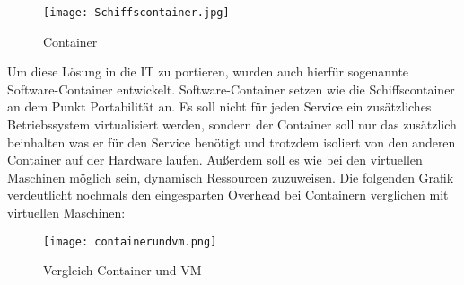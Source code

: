 \begin{figure}[H]
	\begin{center}
		\texttt{[image: Schiffscontainer.jpg]}
	\end{center}
	\caption[Container]{Container \footnotemark}
	\label{fig:HW1}
\end{figure}
Um diese Lösung in die IT zu portieren, wurden auch hierfür sogenannte Software-Container entwickelt.
Software-Container setzen wie die Schiffscontainer an dem Punkt Portabilität an. Es soll nicht für jeden Service ein zusätzliches Betriebssystem virtualisiert werden, sondern der Container soll nur das zusätzlich beinhalten was er für den Service benötigt und trotzdem isoliert von den anderen Container auf der Hardware laufen. Außerdem soll es wie bei den virtuellen Maschinen möglich sein, dynamisch Ressourcen zuzuweisen.\cite{12005068320161201,redhat} 
\newpage
Die folgenden Grafik verdeutlicht nochmals den eingesparten Overhead bei Containern verglichen mit virtuellen Maschinen: 
\begin{figure}[H]
	\begin{center}
		\texttt{[image: containerundvm.png]}
	\end{center}
	\caption[Vergleich Container und VM]{Vergleich Container und VM \footnotemark}
	\label{fig:HW1}
\end{figure}
\newpage



